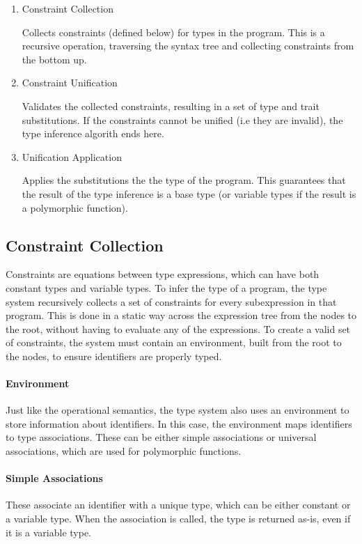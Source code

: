 \documentclass{article}
\begin{document}
\begin{enumerate}
  \item Constraint Collection

    Collects constraints (defined below) for types in the program.
    This is a recursive operation, traversing the syntax tree and collecting constraints from the bottom up.

  \item Constraint Unification

    Validates the collected constraints, resulting in a set of type and trait substitutions.
    If the constraints cannot be unified (i.e they are invalid), the type inference algorith ends here.

  \item Unification Application

    Applies the substitutions the the type of the program.
    This guarantees that the result of the type inference is a base type (or variable types if the result is a polymorphic function).
\end{enumerate}

\subsection{Constraint Collection}

Constraints are equations between type expressions, which can have both constant types and variable types.
To infer the type of a program, the type system recursively collects a set of constraints for every subexpression in that program.
This is done in a static way across the expression tree from the nodes to the root, without having to evaluate any of the expressions.
To create a valid set of constraints, the system must contain an environment, built from the root to the nodes, to ensure identifiers are properly typed.

\paragraph{Environment}
Just like the operational semantics, the type system also uses an environment to store information about identifiers.
In this case, the environment maps identifiers to type associations.
These can be either simple associations or universal associations, which are used for polymorphic functions.

\paragraph{Simple Associations}
These associate an identifier with a unique type, which can be either constant or a variable type.
When the association is called, the type is returned as-is, even if it is a variable type.
\end{document}
